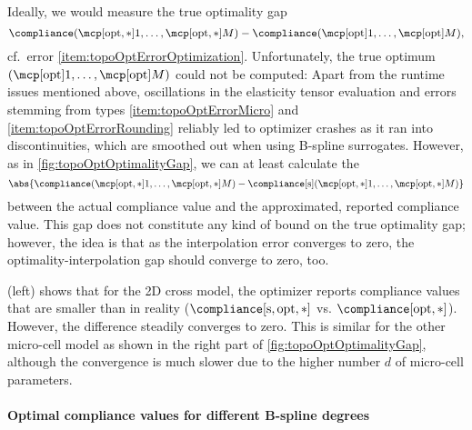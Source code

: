 Ideally, we would measure the true optimality gap
\begin{equation}
  \label{eq:topoOptOptimalityGapTrue}
  \compliance(\mcpoptappr{1}, \dotsc, \mcpoptappr{M}) -
  \compliance(\mcpopt{1}, \dotsc, \mcpopt{M}),
\end{equation}
cf.\ error \ref{item:topoOptErrorOptimization}.
Unfortunately, the true optimum
$(\mcpopt{1}, \dotsc, \mcpopt{M})$ could not be computed:
Apart from the runtime issues mentioned above,
oscillations in the elasticity tensor evaluation and
errors stemming from types
\ref{item:topoOptErrorMicro} and \ref{item:topoOptErrorRounding}
reliably led to optimizer crashes as it ran into discontinuities,
which are smoothed out when using B-spline surrogates.
However, as in \cref{fig:topoOptOptimalityGap},
we can at least calculate the 
\begin{equation}
  \label{eq:topoOptOptimalityGapPseudo}
  \abs{
    \compliance(\mcpoptappr{1}, \dotsc, \mcpoptappr{M}) -
    \complianceintp(\mcpoptappr{1}, \dotsc, \mcpoptappr{M})
  }
\end{equation}
between the actual compliance value
and the approximated, reported compliance value.
This gap does not constitute any kind of bound on the true optimality gap;
however, the idea is that
as the interpolation error converges to zero,
the optimality-interpolation gap should converge to zero, too.

 (left) shows that for the 2D cross model,
the optimizer reports compliance values that are smaller than in reality
($\complianceintp[\opt,\ast]$ vs. $\compliance[\opt,\ast]$).
However, the difference steadily converges to zero.
This is similar for the other micro-cell model as shown in the
right part of \cref{fig:topoOptOptimalityGap},
although the convergence is much slower due to the
higher number $d$ of micro-cell parameters.

\paragraph{Optimal compliance values for different B-spline degrees}

